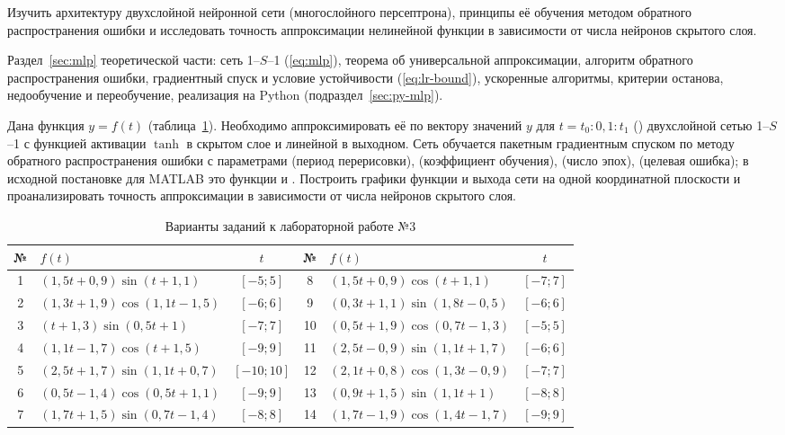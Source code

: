 
Изучить архитектуру двухслойной нейронной сети (многослойного персептрона), принципы её обучения методом
обратного распространения ошибки и исследовать точность аппроксимации нелинейной функции в зависимости
от числа нейронов скрытого слоя.

Раздел~\ref{sec:mlp} теоретической части: сеть 1--$S$--1 (\ref{eq:mlp}), теорема об универсальной
аппроксимации, алгоритм обратного распространения ошибки, градиентный спуск и условие устойчивости
(\ref{eq:lr-bound}), ускоренные алгоритмы, критерии останова, недообучение и переобучение,
реализация на Python (подраздел~\ref{sec:py-mlp}).

Дана функция $y = f(t)$ (таблица~\ref{tab:l3-var}). Необходимо аппроксимировать её по вектору значений
$y$ для $t = t_0 : 0,1 : t_1$ () двухслойной сетью 1--$S$--1 с
функцией активации $\tanh$ в скрытом слое и линейной в выходном. Сеть обучается пакетным градиентным
спуском по методу обратного распространения ошибки с параметрами  (период
перерисовки),  (коэффициент обучения),  (число эпох),
 (целевая ошибка); в исходной постановке для MATLAB это функции  и
. Построить
графики функции и выхода сети на одной координатной плоскости и проанализировать точность
аппроксимации в зависимости от числа нейронов скрытого слоя.

\begin{table}[!htb]
\caption{Варианты заданий к лабораторной работе №3}
\label{tab:l3-var}
\centering\small
\begin{tabular}{clc|clc}
\toprule
№ & $f(t)$ & $t$ & № & $f(t)$ & $t$ \\
\midrule
1 & $(1,5t + 0,9)\sin(t + 1,1)$     & $[-5; 5]$   & 8  & $(1,5t + 0,9)\cos(t + 1,1)$     & $[-7; 7]$ \\
2 & $(1,3t + 1,9)\cos(1,1t - 1,5)$  & $[-6; 6]$   & 9  & $(0,3t + 1,1)\sin(1,8t - 0,5)$  & $[-6; 6]$ \\
3 & $(t + 1,3)\sin(0,5t + 1)$       & $[-7; 7]$   & 10 & $(0,5t + 1,9)\cos(0,7t - 1,3)$  & $[-5; 5]$ \\
4 & $(1,1t - 1,7)\cos(t + 1,5)$     & $[-9; 9]$   & 11 & $(2,5t - 0,9)\sin(1,1t + 1,7)$  & $[-6; 6]$ \\
5 & $(2,5t + 1,7)\sin(1,1t + 0,7)$  & $[-10; 10]$ & 12 & $(2,1t + 0,8)\cos(1,3t - 0,9)$  & $[-7; 7]$ \\
6 & $(0,5t - 1,4)\cos(0,5t + 1,1)$  & $[-9; 9]$   & 13 & $(0,9t + 1,5)\sin(1,1t + 1)$    & $[-8; 8]$ \\
7 & $(1,7t + 1,5)\sin(0,7t - 1,4)$  & $[-8; 8]$   & 14 & $(1,7t - 1,9)\cos(1,4t - 1,7)$  & $[-9; 9]$ \\
\bottomrule
\end{tabular}
\end{table}

